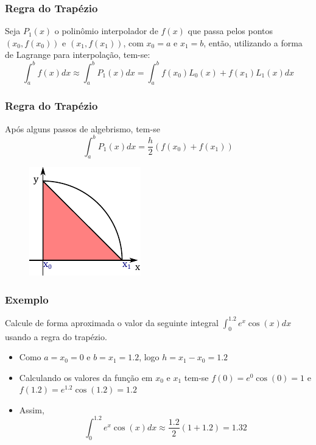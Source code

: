 \documentclass{beamer}
\theoremstyle{mystyle}
\begin{document}
	\begin{frame}
		\frametitle{Regra do Trapézio}
		Seja $ P_{1} (x) $ o polinômio interpolador de $ f (x) $ que passa pelos pontos $ (x_{0} , f (x_{0})) $ e $ (x_{1} , f (x_{1})) $, com $ x_{0} = a $ e $ x_{1} = b $, então, utilizando a forma de Lagrange para interpolação, tem-se:
		\begin{equation*}
			\int_{a}^{b} f(x) dx \approx \int_{a}^{b} P_{1}(x) dx = \int_{a}^{b} f(x_{0})L_{0}(x) + f(x_{1})L_{1}(x) dx
		\end{equation*}
	\end{frame}

	\begin{frame}
		\frametitle{Regra do Trapézio}
		Após alguns passos de algebrismo, tem-se
		\begin{equation*}
			\int_{a}^{b} P_{1}(x) dx = \dfrac{h}{2}\left( f(x_{0}) + f(x_{1}) \right) 
		\end{equation*}
		\begin{figure}
			\centering
			\includegraphics[width=0.4\linewidth]{Figuras/grafico_04}
			\label{fig:grafico04}
		\end{figure}
	\end{frame}

	\begin{frame}
		\frametitle{Exemplo}
		Calcule de forma aproximada o valor da seguinte integral $ \int_{0}^{1.2} e^{x}\cos(x) dx $ usando a regra do trapézio.
		\pause
		
		\begin{itemize}
			\item  Como $ a = x_{0} = 0 $ e $ b = x_{1} = 1.2 $, logo $ h = x_{1} - x_{0} = 1.2$
			\item  Calculando os valores da função em $ x_{0} $ e $ x_{1} $ tem-se $ f(0)  = e^{0}\cos(0) = 1 $ e $ f(1.2)  = e^{1.2}\cos(1.2) = 1.2 $
			\item Assim,
			\begin{equation*}
				\int_{0}^{1.2} e^{x}\cos(x) dx \approx \dfrac{1.2}{2}\left( 1 + 1.2 \right) = 1.32
			\end{equation*}
		\end{itemize}
	\end{frame}
\end{document}
